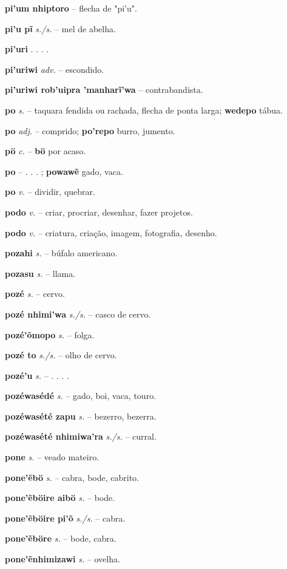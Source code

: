 \textbf{pi'um nhiptoro} -- flecha de "pi'u".

\textbf{pi'u pĩ} \textit{s./s.} -- mel de abelha.

\textbf{pi'uri} . . . .

\textbf{pi'uriwi} \textit{adv.} -- escondido.

\textbf{pi'uriwi rob'uipra 'manharĩ'wa} -- contrabandista.

\textbf{po} \textit{s.} -- taquara fendida ou rachada, flecha de ponta larga; \textbf{wedepo} tábua.

\textbf{po} \textit{adj.} -- comprido; \textbf{po'repo} burro, jumento.

\textbf{pö} \textit{c.} -- \textbf{bö} por acaso.

\textbf{po} -- . . . ; \textbf{powawẽ} gado, vaca.

\textbf{po} \textit{v.} -- dividir, quebrar.

\textbf{podo} \textit{v.} -- criar, procriar, desenhar, fazer projetos.

\textbf{podo} \textit{v.} -- criatura, criação, imagem, fotografia, desenho.

\textbf{pozahi} \textit{s.} -- búfalo americano.

\textbf{pozasu} \textit{s.} -- llama.

\textbf{pozé} \textit{s.} -- cervo.

\textbf{pozé nhimi'wa} \textit{s./s.} -- casco de cervo.

\textbf{pozé'õmopo} \textit{s.} -- folga.

\textbf{pozé to} \textit{s./s.} -- olho de cervo.

\textbf{pozé'u} \textit{s.} -- . . . .

\textbf{pozéwasédé} \textit{s.} -- gado, boi, vaca, touro.

\textbf{pozéwasété zapu} \textit{s.} -- bezerro, bezerra.

\textbf{pozéwasété nhimiwa'ra} \textit{s./s.} -- curral.

\textbf{pone} \textit{s.} -- veado mateiro.

\textbf{pone'ẽbö} \textit{s.} -- cabra, bode, cabrito.

\textbf{pone'ẽböire aibö} \textit{s.} -- bode.

\textbf{pone'ẽböire pi'õ} \textit{s./s.} -- cabra.

\textbf{pone'ẽböre} \textit{s.} -- bode, cabra.

\textbf{pone'ẽnhimizawi} \textit{s.} -- ovelha.

